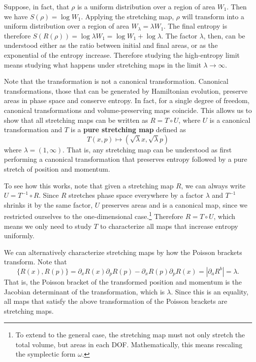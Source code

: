 \documentclass{article}
\begin{document}
Suppose, in fact, that $\rho$ is a uniform distribution over a region of area $W_1$. Then we have $S(\rho)= \log W_1$. Applying the stretching map, $\rho$ will transform into a uniform distribution over a region of area $W_{\lambda} = \lambda W_1$. The final entropy is therefore $S(R(\rho)) = \log \lambda W_1 = \log W_1 + \log \lambda$. The factor $\lambda$, then, can be understood either as the ratio between initial and final areas, or as the exponential of the entropy increase. Therefore studying the high-entropy limit means studying what happens under stretching maps in the limit $\lambda \to \infty$.

Note that the transformation is not a canonical transformation. Canonical transformations, those that can be generated by Hamiltonian evolution, preserve areas in phase space and conserve entropy. In fact, for a single degree of freedom, canonical transformations and volume-preserving maps coincide. This allows us to show that all stretching maps can be written as $R = T \circ U$, where $U$ is a canonical transformation and $T$ is a \textbf{pure stretching map} defined as
\begin{equation}
    T(x,p) \mapsto (\sqrt{\lambda} x, \sqrt{\lambda} p)
\end{equation}
where $\lambda = (1,\infty)$. That is, any stretching map can be understood as first performing a canonical transformation that preserves entropy followed by a pure stretch of position and momentum.

To see how this works, note that given a stretching map $R$, we can always write $U = T^{-1} \circ R$. Since $R$ stretches phase space everywhere by a factor $\lambda$ and $T^{-1}$ shrinks it by the same factor, $U$ preserves areas and is a canonical map, since we restricted ourselves to the one-dimensional case.\footnote{To extend to the general case, the stretching map must not only stretch the total volume, but areas in each DOF. Mathematically, this means rescaling the symplectic form $\omega$.} Therefore $R = T \circ U$, which means we only need to study $T$ to characterize all maps that increase entropy uniformly.

We can alternatively characterize stretching maps by how the  Poisson brackets transform. Note that
\begin{equation}
    \{R(x),R(p)\} = \partial_x R(x) \partial_p R(p) - \partial_x R(p) \partial_p R(x) = | \partial_a R^b | = \lambda.
\end{equation}
That is, the Poisson bracket of the transformed position and momentum is the Jacobian determinant of the transformation, which is $\lambda$. Since this is an equality, all maps that satisfy the above transformation of the Poisson brackets are stretching maps.
\end{document}
